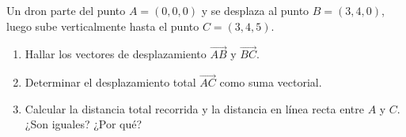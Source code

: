 Un dron parte del punto $A = (0, 0, 0)$ y se desplaza al punto $B = (3, 4, 0)$, luego sube verticalmente hasta el punto $C = (3, 4, 5)$.
\begin{enumerate}
    \item Hallar los vectores de desplazamiento $\overrightarrow{AB}$ y $\overrightarrow{BC}$.
    \item Determinar el desplazamiento total $\overrightarrow{AC}$ como suma vectorial.
    \item Calcular la distancia total recorrida y la distancia en línea recta entre $A$ y $C$. ¿Son iguales? ¿Por qué?
\end{enumerate}